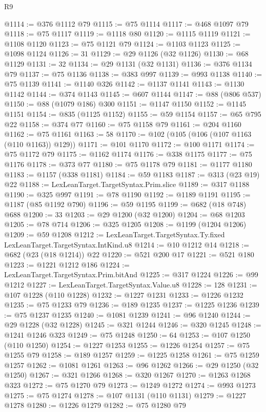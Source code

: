 \begin{lexlean}{R9}
\begin{coremodule}
@1114 := @376 @1112 @79
@1115 := @75 @1114
@1117 := @468 @1097 @79
@1118 := @75 @1117
@1119 := @1118 @80
@1120 := @1115 @1119
@1121 := @1108 @1120
@1123 := @75 @1121 @79
@1124 := @1103 @1123
@1125 := @1098 @1124
@1126 := 31
@1129 := @29 @1126 (@32 @1126)
@1130 := @68 @1129
@1131 := 32
@1134 := @29 @1131 (@32 @1131)
@1136 := @376 @1134 @79
@1137 := @75 @1136
@1138 := @383 @997
@1139 := @993 @1138
@1140 := @75 @1139
@1141 := @1140 @326
@1142 := @1137 @1141
@1143 := @1130 @1142
@1144 := @374 @1143
@1145 := @607 @1144
@1147 := @88 (@806 @537)
@1150 := @88 (@1079 @186) @300
@1151 := @1147 @1150
@1152 := @1145 @1151
@1154 := @835 (@1125 @1152)
@1155 := @59 @1154
@1157 := @65 @795 @22
@1158 := @374 @77
@1160 := @75 @1158 @79
@1161 := @204 @1160
@1162 := @75 @1161
@1163 := 58
@1170 := @102 (@105 (@106 (@107 @1163 (@110 @1163)) @129))
@1171 := @101 @1170
@1172 := @100 @1171
@1174 := @75 @1172 @79
@1175 := @1162 @1174
@1176 := @338 @1175
@1177 := @75 @1176
@1178 := @373 @77
@1180 := @75 @1178 @79
@1181 := @1177 @1180
@1183 := @1157 (@338 @1181)
@1184 := @59 @1183
@1187 := @313 (@23 @19) @22
@1188 := LexLeanTarget.TargetSyntax.Prim.slice
@1189 := @317 @1188
@1190 := @325 @997
@1191 := @78 @1190
@1192 := @1189 @1191
@1195 := @1187 (@85 @1192 @790)
@1196 := @59 @1195
@1199 := @682 (@18 @748) @688
@1200 := 33
@1203 := @29 @1200 (@32 @1200)
@1204 := @68 @1203
@1205 := @78 @714
@1206 := @325 @1205
@1208 := @1199 (@1204 @1206)
@1209 := @59 @1208
@1212 := LexLeanTarget.TargetSyntax.Ty.fixed LexLeanTarget.TargetSyntax.IntKind.u8
@1214 := @10 @1212 @14
@1218 := @682 (@23 (@18 @1214)) @22
@1220 := @521 @200 @17
@1221 := @521 @180
@1223 := @1221 @1212 @186
@1224 := LexLeanTarget.TargetSyntax.Prim.bitAnd
@1225 := @317 @1224
@1226 := @99 @1212
@1227 := LexLeanTarget.TargetSyntax.Value.u8
@1228 := 128
@1231 := @107 @1228 (@110 @1228)
@1232 := @1227 @1231
@1233 := @1226 @1232
@1235 := @75 @1233 @79
@1236 := @189 @1235
@1237 := @1225 @1236
@1239 := @75 @1237 @1235
@1240 := @1081 @1239
@1241 := @96 @1240
@1244 := @29 @1228 (@32 @1228)
@1245 := @321 @1244
@1246 := @320 @1245
@1248 := @1241 @1246 @323
@1249 := @75 @1248
@1250 := 64
@1253 := @107 @1250 (@110 @1250)
@1254 := @1227 @1253
@1255 := @1226 @1254
@1257 := @75 @1255 @79
@1258 := @189 @1257
@1259 := @1225 @1258
@1261 := @75 @1259 @1257
@1262 := @1081 @1261
@1263 := @96 @1262
@1266 := @29 @1250 (@32 @1250)
@1267 := @321 @1266
@1268 := @320 @1267
@1270 := @1263 @1268 @323
@1272 := @75 @1270 @79
@1273 := @1249 @1272
@1274 := @993 @1273
@1275 := @75 @1274
@1278 := @107 @1131 (@110 @1131)
@1279 := @1227 @1278
@1280 := @1226 @1279
@1282 := @75 @1280 @79

\end{coremodule}
\end{lexlean}
